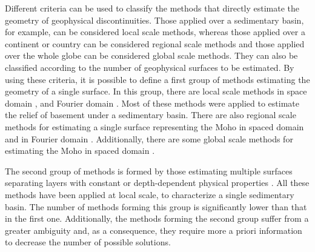 \documentclass[manuscript]{geophysics}
\begin{document}
Different criteria can be used to classify the methods that directly estimate
the geometry of geophysical discontinuities.
Those applied over a sedimentary basin, for example, can be considered local scale methods,
whereas those applied over a continent or country can be considered regional scale methods
and those applied over the whole globe can be considered global scale methods.
They can also be classified according to the number of geophysical surfaces
to be estimated.
By using these criteria, it is possible to define a first group of methods
estimating the geometry of a single surface.
In this group, there are local scale methods in space domain
\citep[e.g.,][]{bott1960, tanner1967, cordell-henderson1968, dyrelius-vogel1972, pedersen1977,
pilkington-crossley1986, richardson-macinnes1989, barbosa-etal1997, condi-etal1999, 
barbosa-etal1999, barbosa-etal1999b, silva-etal2006, pilkington2006, 
chakravarthi-sundararajan2007, martins-etal2010, silva-etal2010, lima-etal2011, 
martins-etal2011, barnes-barraud2012, silva-etal2014, silva-santos2017},
and Fourier domain
\citep[e.g.,][]{oldenburg1974, granser1987, reamer-ferguson1989, guspi1993}.
Most of these methods were applied to estimate the relief of basement under
a sedimentary basin.
There are also regional scale methods for estimating a single surface 
representing the Moho in spaced domain 
\citep[e.g.,][]{shin-etal2009, bagherbandi-eshagh2012, barzaghi-biagi2014, sampietro2015, uieda-barbosa2017} and in Fourier domain 
\citep[e.g.,][]{braitenberg-etal1997, braitenberg-zadro1999, vandermeijde-etal2013}.
Additionally, there are some global scale methods for estimating the Moho
in spaced domain
\citep[e.g.,][]{sunkel1985, sjoberg2009}.

The second group of methods is formed by those estimating multiple surfaces
separating layers with constant or depth-dependent physical properties 
\citep[e.g.,][]{pilkington-crossley1986b, gallardo-etal2005, 
camacho-etal2011, salem-etal2014}.
All these methods have been applied at local scale, to characterize a single 
sedimentary basin.
The number of methods forming this group is significantly lower than that
in the first one.
Additionally, the methods forming the second group suffer from a greater 
ambiguity and, as a consequence, they require more a priori information to
decrease the number of possible solutions.
\end{document}
